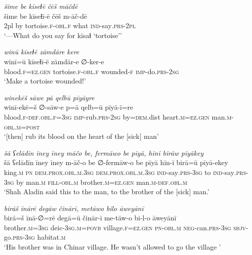 \ea \label{DG.48}
\textit{šime be kīseɫē čēš māčdē} \\ 
\gll šime be kīseɫī-ē čēš m-āč-dē \\ 
 2pl by tortoise\textsc{\textsc{.f}}\textsc{-obl}\textsc{\textsc{.f}} what \textsc{ind-}say\textsc{.prs}\textsc{-2pl} \\ 
\glt `—What do you say for kīsaɫ ‘tortoise’'
\z 
 
\ea \label{DG.49}
\textit{winū kīseɫē zāmdāre kere} \\ 
\gll winī=ū kīseɫī-ē zāmdār-e ∅-ker-e \\ 
 blood\textsc{\textsc{.f}}\textsc{=ez}\textsc{.gen} tortoise\textsc{\textsc{.f}}\textsc{-obl}\textsc{\textsc{.f}} wounded\textsc{-f} \textsc{imp-}do\textsc{.prs}-\textsc{2sg} \\ 
\glt `Make a tortoise wounded!'
\z 
 
\ea \label{DG.50}
\textit{winekēš sāwe pā qelbū pīyāyre} \\ 
\gll winī-ekē=š ∅-sāw-e p=ā qelb=ū pīyā-ī=re \\ 
 blood\textsc{\textsc{.f}}\textsc{-def}\textsc{.obl}\textsc{\textsc{.f}}\textsc{=3sg} \textsc{imp-}rub\textsc{.prs}-\textsc{2sg} by\textsc{=dem}.dist heart\textsc{.m}\textsc{=ez}\textsc{.gen} man\textsc{.m}\textsc{-obl}\textsc{.m}\textsc{=\textsc{post}} \\ 
\glt `[then] rub its blood on the heart of the [sick] man'
\z 
 
\ea \label{DG.53}
\textit{šā ʕelādīn īney īney māčo be, fermāwo be pīyā, hīnī birāw pīyākey} \\ 
\gll šā ʕelādīn īney īney m-āč-o be ∅-fermāw-o be pīyā hīn-ī birā=ū pīyā-ekey \\ 
 king\textsc{.m} \textsc{pn} \textsc{dem.prox}\textsc{.obl}\textsc{.m}\textsc{.3sg} \textsc{dem.prox}\textsc{.obl}\textsc{.m}\textsc{.3sg} \textsc{ind-}say\textsc{.prs}\textsc{-3sg} to \textsc{ind-}say\textsc{.prs}\textsc{-3sg} by man\textsc{.m} \textsc{fill}\textsc{-obl}\textsc{.m} brother\textsc{.m}\textsc{=ez}\textsc{.gen} man\textsc{.m}\textsc{-def}\textsc{.obl}\textsc{.m} \\ 
\glt `Shah Aladin said this to the man, to the brother of the [sick] man.'
\z 
 
\ea \label{DG.54}
\textit{birāš īnārē degāw činārī, metāwo bilo āweyānī} \\ 
\gll birā=š īnā-∅=rē degā=ū činār-ī me-tāw-o bi-l-o āweyānī \\ 
 brother\textsc{.m}\textsc{=3sg} deic\textsc{-3sg}\textsc{.m}\textsc{=\textsc{povb}} village\textsc{\textsc{.f}}\textsc{=ez}\textsc{.gen} \textsc{pn}\textsc{-obl}\textsc{.m} \textsc{neg-}can\textsc{.prs}\textsc{-3sg} \textsc{sbjv-}go\textsc{.prs}\textsc{-3sg} habitat\textsc{\textsc{.m}} \\ 
\glt `His brother was in Chinar village. He wasn’t allowed to go the village '
\z 
 

